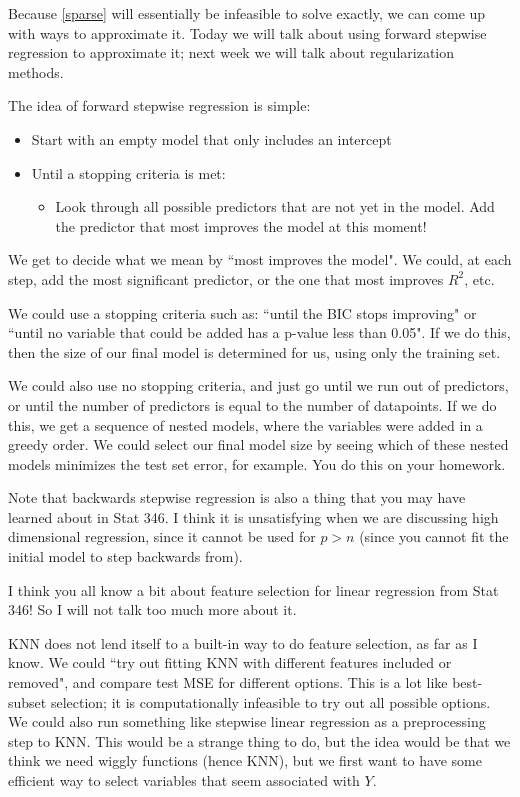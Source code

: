 Because \eqref{sparse} will essentially be infeasible to solve exactly, we can come up with ways to approximate it. Today we will talk about using forward stepwise regression to approximate it; next week we will talk about regularization methods.

The idea of forward stepwise regression is simple:
\begin{itemize}
\item Start with an empty model that only includes an intercept
\item Until a stopping criteria is met:
\begin{itemize}
\item Look through all possible predictors that are not yet in the model. Add the predictor that most improves the model at this moment! 
\end{itemize}	
\end{itemize}

We get to decide what we mean by ``most improves the model". We could, at each step, add the most significant predictor, or the one that most improves $R^2$, etc.

We could use a stopping criteria such as: ``until the BIC stops improving" or ``until no variable that could be added has a p-value less than 0.05". If we do this, then the size of our final model is determined for us, using only the training set.

We could also use no stopping criteria, and just go until we run out of predictors, or until the number of predictors is equal to the number of datapoints. If we do this, we get a sequence of nested models, where the variables were added in a greedy order. We could select our final model size by seeing which of these nested models minimizes the test set error, for example. You do this on your homework.  

Note that backwards stepwise regression is also a thing that you may have learned about in Stat 346. I think it is unsatisfying when we are discussing high dimensional regression, since it cannot be used for $p > n$ (since you cannot fit the initial model to step backwards from). 

I think you all know a bit about feature selection for linear regression from Stat 346! So I will not talk too much more about it.

KNN does not lend itself to a built-in way to do feature selection, as far as I know. We could ``try out fitting KNN with different features included or removed", and compare test MSE for different options. This is a lot like best-subset selection; it is computationally infeasible to try out all possible options. We could also run something like stepwise linear regression as a preprocessing step to KNN. This would be a strange thing to do, but the idea would be that we think we need wiggly functions (hence KNN), but we first want to have some efficient way to select variables that seem associated with $Y$.

